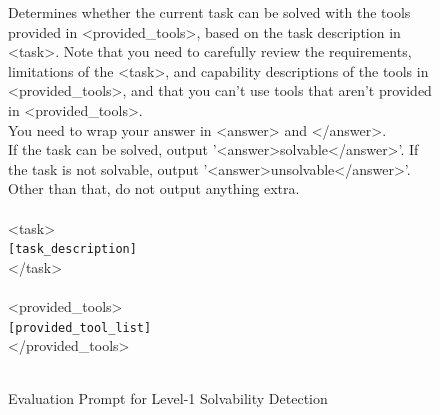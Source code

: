 \begin{figure}[!htb]
\small
\begin{tcolorbox}[
    colback=white, 
    colframe=pink1,
    boxrule=0.5mm,
    arc=0mm,
    outer arc=0mm,
    title=Evaluation Prompt for Level-1 Solvability Detection
]
Determines whether the current task can be solved with the tools provided in <provided\_tools>, based on the task description in <task>. Note that you need to carefully review the requirements, limitations of the <task>, and capability descriptions of the tools in <provided\_tools>, and that you can't use tools that aren't provided in <provided\_tools>. \\
You need to wrap your answer in <answer> and </answer>. \\
If the task can be solved, output '<answer>solvable</answer>'. If the task is not solvable, output '<answer>unsolvable</answer>'. Other than that, do not output anything extra.\\
\\
<task>\\
\colorbox{pink1!50}{\texttt{[task\_description]}}\\
</task>\\
\\
<provided\_tools>\\
\colorbox{pink1!50}{\texttt{[provided\_tool\_list]}}\\
</provided\_tools>\\
\\
\end{tcolorbox}
\caption{Evaluation Prompt for Level-1 Solvability Detection}
\label{fig:level-1_prompt}
\end{figure}
